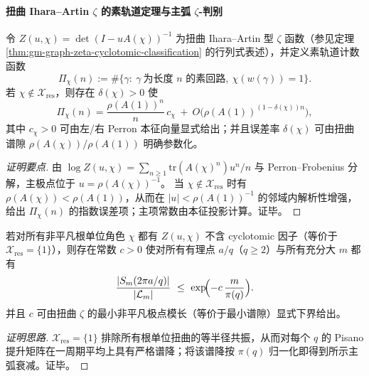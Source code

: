 \paragraph{扭曲 Ihara--Artin \texorpdfstring{$\zeta$}{zeta} 的素轨道定理与主弧 \texorpdfstring{$\zeta$}{zeta}-判别}
\begin{theorem}\label{thm:gm-twisted-zeta-prime-orbit}
令 \(Z(u,\chi)=\det(I-uA(\chi))^{-1}\) 为扭曲 Ihara--Artin 型 \(\zeta\) 函数（参见定理 \ref{thm:gm-graph-zeta-cyclotomic-classification} 的行列式表述），并定义素轨道计数函数
\[
\Pi_\chi(n):=\#\{\gamma:\ \gamma\ \text{为长度 }n\text{ 的素回路},\ \chi(w(\gamma))=1\}.
\]
若 \(\chi\notin\mathcal{X}_{\mathrm{res}}\)，则存在 \(\delta(\chi)>0\) 使
\[
\Pi_\chi(n)
=\frac{\rho(A(1))^n}{n}\,c_\chi\ +\ O\!\bigl(\rho(A(1))^{(1-\delta(\chi))n}\bigr),
\]
其中 \(c_\chi>0\) 可由左/右 Perron 本征向量显式给出；并且误差率 \(\delta(\chi)\) 可由扭曲谱隙 \(\rho(A(\chi))/\rho(A(1))\) 明确参数化。
\end{theorem}

\begin{proof}[证明要点]
由 \(\log Z(u,\chi)=\sum_{n\ge 1}\mathrm{tr}(A(\chi)^n)u^n/n\) 与 Perron--Frobenius 分解，主极点位于 \(u=\rho(A(\chi))^{-1}\)。
当 \(\chi\notin\mathcal{X}_{\mathrm{res}}\) 时有 \(\rho(A(\chi))<\rho(A(1))\)，从而在 \(|u|<\rho(A(1))^{-1}\) 的邻域内解析性增强，给出 \(\Pi_\chi(n)\) 的指数误差项；主项常数由本征投影计算。证毕。
\end{proof}

\begin{proposition}[主弧谱压制的 \texorpdfstring{$\zeta$}{zeta}-判别：无 cyclotomic 因子 \texorpdfstring{$\Rightarrow$}{=>} 统一主弧衰减]\label{prop:gm-zeta-criterion-major-arc}
若对所有非平凡根单位角色 \(\chi\) 都有 \(Z(u,\chi)\) 不含 cyclotomic 因子（等价于 \(\mathcal{X}_{\mathrm{res}}=\{1\}\)），则存在常数 \(c>0\) 使对所有有理点 \(a/q\)（\(q\ge 2\)）与所有充分大 \(m\) 都有
\[
\frac{|S_m(2\pi a/q)|}{|\mathcal{L}_m|}\ \le\ \exp\!\Bigl(-c\,\frac{m}{\pi(q)}\Bigr).
\]
并且 \(c\) 可由扭曲 \(\zeta\) 的最小非平凡极点模长（等价于最小谱隙）显式下界给出。
\end{proposition}

\begin{proof}[证明思路]
\(\mathcal{X}_{\mathrm{res}}=\{1\}\) 排除所有根单位扭曲的等半径共振，从而对每个 \(q\) 的 Pisano 提升矩阵在一周期平均上具有严格谱降；将该谱降按 \(\pi(q)\) 归一化即得到所示主弧衰减。证毕。
\end{proof}

